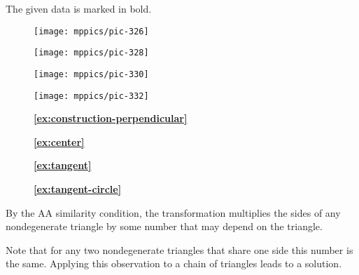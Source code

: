 The given data is marked in bold.

\medskip

\begin{figure}[!ht]
\begin{minipage}{.24\textwidth}
\centering
\texttt{[image: mppics/pic-326]}
\end{minipage}
\hfill
\begin{minipage}{.24\textwidth}
\centering
\texttt{[image: mppics/pic-328]}
\end{minipage}
\hfill
\begin{minipage}{.24\textwidth}
\centering
\texttt{[image: mppics/pic-330]}
\end{minipage}
\hfill
\begin{minipage}{.24\textwidth}
\centering
\texttt{[image: mppics/pic-332]}
\end{minipage}

\medskip

\begin{minipage}{.24\textwidth}
\centering
\caption*{\textbf{\ref{ex:construction-perpendicular}}}
\end{minipage}
\hfill
\begin{minipage}{.24\textwidth}
\centering
\caption*{\textbf{\ref{ex:center}}}
\end{minipage}
\hfill
\begin{minipage}{.24\textwidth}
\centering
\caption*{\textbf{\ref{ex:tangent}}}
\end{minipage}
\hfill
\begin{minipage}{.24\textwidth}
\centering
\caption*{\textbf{\ref{ex:tangent-circle}}}
\end{minipage}
\vskip-4mm
\end{figure}

\setcounter{eqtn}{0}

By the AA similarity condition, the transformation multiplies the sides of any nondegenerate triangle by some number that may depend on the triangle. 

Note that for any two nondegenerate triangles that share one side this number is the same.
Applying this observation to a chain of triangles leads to a solution.


